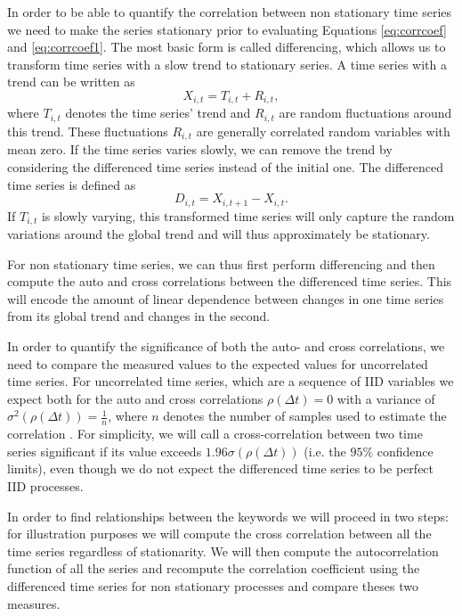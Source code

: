 \documentclass[12pt, a4paper]{article}
\begin{document}
In order to be able to quantify the correlation between non stationary time series we need to make the series stationary prior to evaluating Equations \ref{eq:corrcoef} and \ref{eq:corrcoef1}. The most basic form is called differencing, which allows us to transform time series with a slow trend to stationary series. A time series with a trend can be written as \cite{dettling14}
\begin{equation}
X_{i, t} = T_{i, t} + R_{i, t},
\end{equation} 
where $T_{i, t}$ denotes the time series' trend and $R_{i, t}$ are random fluctuations around this trend. These fluctuations $R_{i, t}$ are generally correlated random variables with mean zero. If the time series varies slowly, we can remove the trend by considering the differenced time series instead of the initial one. The differenced time series is defined as \cite{dettling14}
\begin{equation}
D_{i, t} = X_{i, t+1}- X_{i, t}.
\end{equation} 
If $T_{i, t}$ is slowly varying, this transformed time series will only capture the random variations around the global trend and will thus approximately be stationary.

For non stationary time series, we can thus first perform differencing and then compute the auto and cross correlations between the differenced time series. This will encode the amount of linear dependence between changes in one time series from its global trend and changes in the second. 

In order to quantify the significance of both the auto- and cross correlations, we need to compare the measured values to the expected values for uncorrelated time series. For uncorrelated time series, which are a sequence of IID variables we expect both for the auto and cross correlations $\rho(\Delta t) = 0$ with a variance of $\sigma^{2}(\rho(\Delta t)) = \frac{1}{n}$, where $n$ denotes the number of samples used to estimate the correlation \cite{dettling14}. For simplicity, we will call a cross-correlation between two time series significant if its value exceeds $1.96 \sigma(\rho(\Delta t))$ (i.e. the $95 \%$ confidence limits), even though we do not expect the differenced time series to be perfect IID processes. 

In order to find relationships between the keywords we will proceed in two steps: for illustration purposes we will compute the cross correlation between all the time series regardless of stationarity. We will then compute the autocorrelation function of all the series and recompute the correlation coefficient using the differenced time series for non stationary processes and compare theses two measures.
\end{document}
